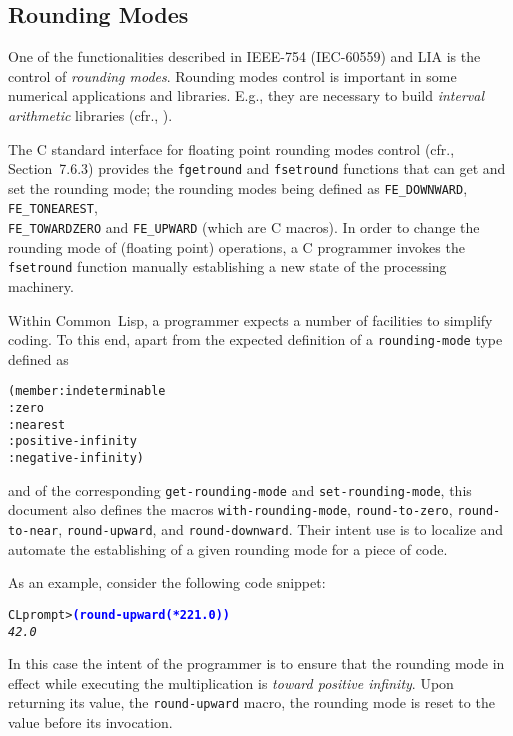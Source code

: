 \documentclass[10pt,fleqn]{article}
\newcommand{\CL}{\textsf{Common~Lisp}}
\newcommand{\CLang}{\textsf{C}}
\newcommand{\code}[1]{\texttt{#1}}
\newcommand{\codeprompt}[1]{\textcolor{blue}{\textbf{#1}}}
\newcommand{\IEEEFPStd}{IEEE-754}
\newcommand{\IECFPStd}{IEC-60559}
\begin{document}
\subsection{Rounding Modes}

One of the functionalities described in \IEEEFPStd{} (\IECFPStd{}) and LIA is
the control of \emph{rounding modes}.  Rounding modes control is
important in some numerical applications and libraries.  E.g., they
are necessary to build \emph{interval arithmetic} libraries (cfr., \cite{hickey:interval:2001,kulisch:complete:2009,revol:introIEEEIA:2017}).

The \CLang{} standard interface for floating point rounding modes
control (cfr., \cite{2018:C18} Section~7.6.3) provides the \code{fgetround}
and \code{fsetround} functions that can get and set the rounding mode;
the rounding modes being defined as \code{FE\_DOWNWARD},
\code{FE\_TONEAREST},\\
\code{FE\_TOWARDZERO} and \code {FE\_UPWARD} (which are \CLang{}
macros).  In order to change the rounding mode of (floating point)
operations, a \CLang{} programmer invokes the \code{fsetround}
function manually establishing a new state of the processing
machinery.

Within \CL{}, a programmer expects a number of facilities to simplify
coding.  To this end, apart from the expected definition of a
\code{rounding-mode} type defined as
\begin{alltt}
(member :indeterminable
        :zero
        :nearest
        :positive-infinity
        :negative-infinity)
\end{alltt}
and of the corresponding \code{get-rounding-mode} and
\code{set-rounding-mode}, this document also defines the macros
\code{with-rounding-mode}, \code{round-to-zero}, \code{round-to-near},
\code{round-upward}, and \code{round-downward}.  Their intent use is
to localize and automate the establishing of a given rounding mode for
a piece of code.

\vspace*{3mm}

\noindent
As an example, consider the following code snippet:
\begin{alltt}
CL prompt> \codeprompt{(round-upward (* 2 21.0))}
\textit{42.0}
\end{alltt}
In this case the intent of the programmer is to ensure that the
rounding mode in effect while executing the multiplication is
\emph{toward positive infinity}.  Upon returning its value, the
\code{round-upward} macro, the rounding mode is reset to the value
before its invocation.
\end{document}
